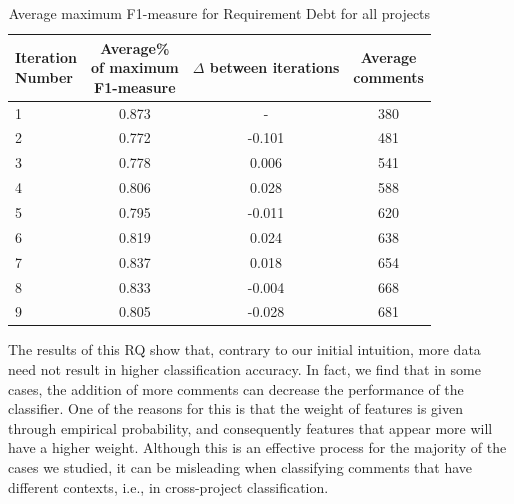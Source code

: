 \begin{table}[!thb]
	\begin{center}
		\caption{Average maximum F1-measure for Requirement Debt for all projects}
		\label{tbl:requirement_iteration_performance}
		\begin{tabular}{l| c c c}
			\toprule
			\thead{Iteration\\Number} & \thead{Average\%\\of maximum\\F1-measure} & \thead{$\Delta$\\between\\iterations} & \thead{Average\\comments} \\
			\midrule
			1  &  0.873 &   -      &  380 \\  
      2  &  0.772 & -0.101   &  481 \\
      3  &  0.778 & 0.006    &  541 \\  
      4  &  0.806 & 0.028    &  588 \\
      5  &  0.795 & -0.011   &  620  \\
      6  &  0.819 & 0.024    &  638  \\
			7  &  0.837 & 0.018    &  654  \\  
      8  &  0.833 & -0.004   &  668  \\  
      9  &  0.805 & -0.028   &  681  \\  
			\bottomrule
		\end{tabular}
	\end{center}    
\end{table}


The results of this RQ show that, contrary to our initial intuition, more data need not result in higher classification accuracy. In fact, we find that in some cases, the addition of more comments can decrease the performance of the classifier. One of the reasons for this is that the weight of features is given through empirical probability, and consequently features that appear more will have a higher weight. Although this is an effective process for the majority of the cases we studied, it can be misleading when classifying comments that have different contexts, i.e., in cross-project classification.

